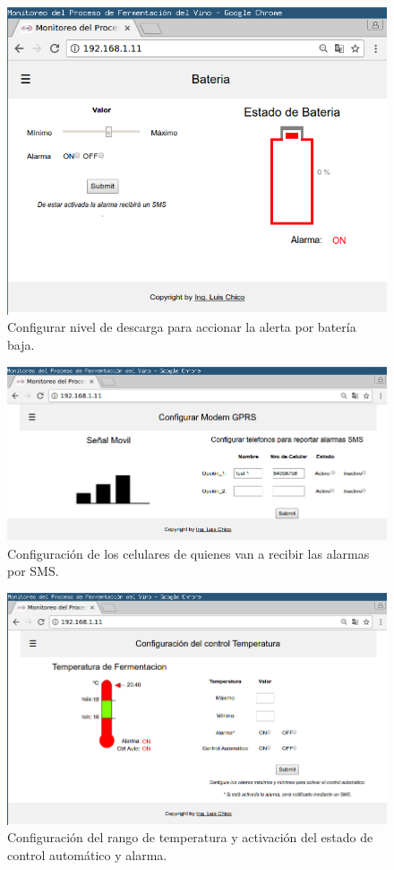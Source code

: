 \begin{figure}[h]
  \centering
  \includegraphics[scale=.25]{./Figures/config_bat.png}
  \caption{Configurar nivel de descarga para accionar la alerta por batería baja.}
  \label{fig:web_bat}
\end{figure}
\begin{figure}[h]
  \centering
  \includegraphics[scale=.25]{./Figures/config_Modem.png}
  \caption{Configuración de los celulares de quienes van a recibir las alarmas por SMS.}
  \label{fig:web_Modem}
\end{figure}
\begin{figure}[h]
  \centering
  \includegraphics[scale=.25]{./Figures/config_temp.png}
  \caption{Configuración del rango de temperatura y activación del estado de control automático y alarma.}
  \label{fig:web_temp}
\end{figure}


